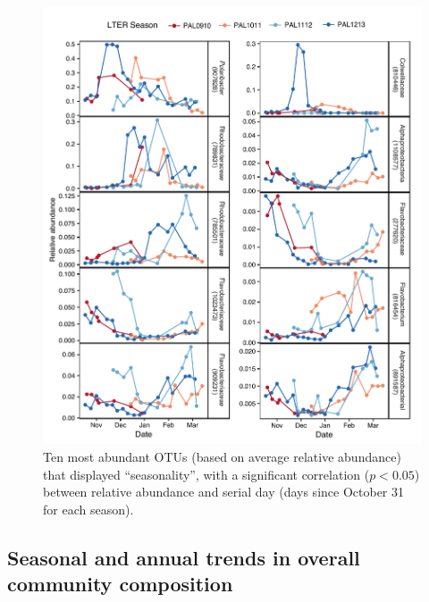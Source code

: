 \begin{figure}[htbp] 
\centering 
\includegraphics[width=1.0\textwidth]{Chapter_5_LTER/Figures/Figure_7_seasonal_otus}
\caption[Ten most abundant OTUs that displayed ``seasonality''.]{Ten most abundant OTUs (based on average relative abundance) that displayed ``seasonality'', with a significant correlation ($p < 0.05$) between relative abundance and serial day (days since October 31 for each season).} 
\label{fig:ch4:seasonal_otu} 
\end{figure}

\subsection{Seasonal and annual trends in overall community composition}

